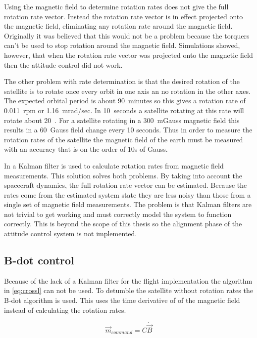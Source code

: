 Using the magnetic field to determine rotation rates does not give the full rotation rate vector. Instead the rotation rate vector is in effect projected onto the magnetic field, eliminating any rotation rate around the magnetic field. Originally it was believed that this would not be a problem because the torquers can't be used to stop rotation around the magnetic field. Simulations showed, however, that when the rotation rate vector was projected onto the magnetic field then the attitude control did not work.

The other problem with rate determination is that the desired rotation of the satellite is to rotate once every orbit in one axis an no rotation in the other axes. The expected orbital period is about 90~minutes so this gives a rotation rate of 0.011~rpm or 1.16~mrad/sec. In 10~seconds a satellite rotating at this rate will rotate about 20~\textmu\textdegree. For a satellite rotating in a 300~mGauss magnetic field this results in a 60~\textmu Gauss field change every 10 seconds. Thus in order to measure the rotation rates of the satellite the magnetic field of the earth must be measured with an accuracy that is on the order of 10s of \textmu Gauss. 

In \cite{Sturm05} a Kalman filter is used to calculate rotation rates from magnetic field measurements. This solution solves both problems. By taking into account the spacecraft dynamics, the full rotation rate vector can be estimated. Because the rates come from the estimated system state they are less noisy than those from a single set of magnetic field measurements. The problem is that Kalman filters are not trivial to get working and must correctly model the system to function correctly. This is beyond the scope of this thesis so the alignment phase of the attitude control system is not implemented.

\subsection{B-dot control}

Because of the lack of a Kalman filter for the flight implementation the algorithm in \cref{eq:crossl} can not be used. To detumble the satellite without rotation rates the B-dot algorithm is used. This uses the time derivative of of the magnetic field instead of calculating the rotation rates.

\begin{equation}
    \vec{m}_{command}= C \dot{\vec{B}}
    \label{eq:bg-bdot}
\end{equation}

